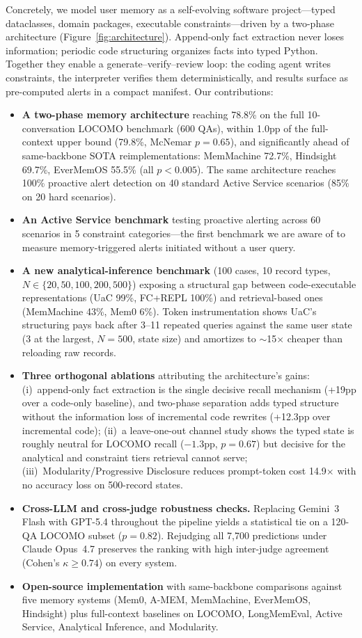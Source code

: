 Concretely, we model user memory as a self-evolving software project---typed dataclasses, domain packages, executable constraints---driven by a two-phase architecture (Figure~\ref{fig:architecture}). Append-only fact extraction never loses information; periodic code structuring organizes facts into typed Python. Together they enable a generate--verify--review loop: the coding agent writes constraints, the interpreter verifies them deterministically, and results surface as pre-computed alerts in a compact manifest. Our contributions:
\begin{itemize}[leftmargin=*]
\item \textbf{A two-phase memory architecture} reaching 78.8\% on the full 10-conversation LOCOMO benchmark (600 QAs), within 1.0pp of the full-context upper bound (79.8\%, McNemar $p{=}0.65$), and significantly ahead of same-backbone SOTA reimplementations: MemMachine 72.7\%, Hindsight 69.7\%, EverMemOS 55.5\% (all $p<0.005$). The same architecture reaches 100\% proactive alert detection on 40 standard Active Service scenarios (85\% on 20 hard scenarios).
\item \textbf{An Active Service benchmark} testing proactive alerting across 60 scenarios in 5 constraint categories---the first benchmark we are aware of to measure memory-triggered alerts initiated without a user query.
\item \textbf{A new analytical-inference benchmark} (100 cases, 10 record types, $N{\in}\{20, 50, 100, 200, 500\}$) exposing a structural gap between code-executable representations (UaC 99\%, FC+REPL 100\%) and retrieval-based ones (MemMachine 43\%, Mem0 6\%). Token instrumentation shows UaC's structuring pays back after 3--11 repeated queries against the same user state (3 at the largest, $N{=}500$, state size) and amortizes to $\sim$15$\times$ cheaper than reloading raw records.
\item \textbf{Three orthogonal ablations} attributing the architecture's gains: (i)~append-only fact extraction is the single decisive recall mechanism (+19pp over a code-only baseline), and two-phase separation adds typed structure without the information loss of incremental code rewrites (+12.3pp over incremental code); (ii)~a leave-one-out channel study shows the typed state is roughly neutral for LOCOMO recall ($-1.3$pp, $p{=}0.67$) but decisive for the analytical and constraint tiers retrieval cannot serve; (iii)~Modularity/Progressive Disclosure reduces prompt-token cost 14.9$\times$ with no accuracy loss on 500-record states.
\item \textbf{Cross-LLM and cross-judge robustness checks.} Replacing Gemini~3 Flash with GPT-5.4 throughout the pipeline yields a statistical tie on a 120-QA LOCOMO subset ($p{=}0.82$). Rejudging all 7{,}700 predictions under Claude Opus~4.7 preserves the ranking with high inter-judge agreement (Cohen's $\kappa \geq 0.74$) on every system.
\item \textbf{Open-source implementation} with same-backbone comparisons against five memory systems (Mem0, A-MEM, MemMachine, EverMemOS, Hindsight) plus full-context baselines on LOCOMO, LongMemEval, Active Service, Analytical Inference, and Modularity.
\end{itemize}



